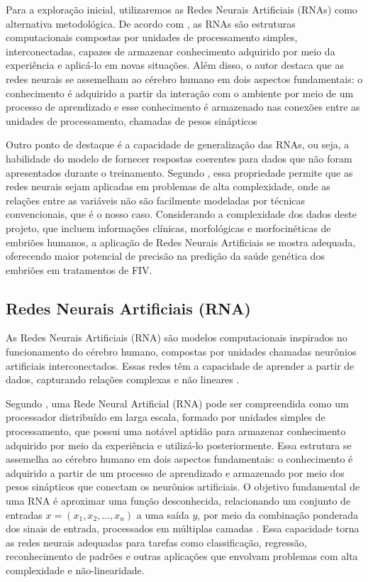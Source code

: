 Para a exploração inicial, utilizaremos as Redes Neurais Artificiais (RNAs) como alternativa metodológica. De acordo com , as RNAs são estruturas computacionais compostas por unidades de processamento simples, interconectadas, capazes de armazenar conhecimento adquirido por meio da experiência e aplicá-lo em novas situações. Além disso, o autor destaca que as redes neurais se assemelham ao cérebro humano em dois aspectos fundamentais: o conhecimento é adquirido a partir da interação com o ambiente por meio de um processo de aprendizado e esse conhecimento é armazenado nas conexões entre as unidades de processamento, chamadas de pesos sinápticos

Outro ponto de destaque é a capacidade de generalização das RNAs, ou seja, a habilidade do modelo de fornecer respostas coerentes para dados que não foram apresentados durante o treinamento. Segundo , essa propriedade permite que as redes neurais sejam aplicadas em problemas de alta complexidade, onde as relações entre as variáveis não são facilmente modeladas por técnicas convencionais, que é o nosso caso. Considerando a complexidade dos dados deste projeto, que incluem informações clínicas, morfológicas e morfocinéticas de embriões humanos, a aplicação de Redes Neurais Artificiais se mostra adequada, oferecendo maior potencial de precisão na predição da saúde genética dos embriões em tratamentos de FIV.

\subsection{Redes Neurais Artificiais (RNA)}

As Redes Neurais Artificiais (RNA) são modelos computacionais inspirados no funcionamento do cérebro humano, compostas por unidades chamadas neurônios artificiais interconectados. Essas redes têm a capacidade de aprender a partir de dados, capturando relações complexas e não lineares \cite{haykin2009}.

Segundo , uma Rede Neural Artificial (RNA) pode ser compreendida como um processador distribuído em larga escala, formado por unidades simples de processamento, que possui uma notável aptidão para armazenar conhecimento adquirido por meio da experiência e utilizá-lo posteriormente. Essa estrutura se assemelha ao cérebro humano em dois aspectos fundamentais: o conhecimento é adquirido a partir de um processo de aprendizado e armazenado por meio dos pesos sinápticos que conectam os neurônios artificiais. O objetivo fundamental de uma RNA é aproximar uma função desconhecida, relacionando um conjunto de entradas $x = (x_1, x_2, \ldots, x_n)$ a uma saída $y$, por meio da combinação ponderada dos sinais de entrada, processados em múltiplas camadas \cite{haykin2009}. Essa capacidade torna as redes neurais adequadas para tarefas como classificação, regressão, reconhecimento de padrões e outras aplicações que envolvam problemas com alta complexidade e não-linearidade.

